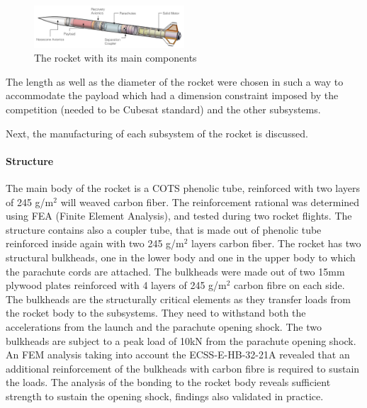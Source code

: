 \begin{figure}[h!]
\centering
\includegraphics[width=0.5\textwidth]{img/rocket_sw_annotated.jpg}
\caption{The rocket with its main components}
\label{f:rocket_adnoted}
\end{figure}

The length as well as the diameter of the rocket were chosen in such a way to accommodate the payload which had a dimension constraint imposed by the competition (needed to be Cubesat standard) and the other subsystems.

Next, the manufacturing of each subsystem of the rocket is discussed.



\paragraph{Structure}
\hfill \break
The main body of the rocket is a COTS phenolic tube, reinforced with two layers of 245 g/m$^2$ will weaved carbon fiber. The reinforcement rational was determined using FEA (Finite Element Analysis), and tested during two rocket flights.
The structure contains also a coupler tube, that is made out of phenolic tube reinforced inside again with two 245 g/m$^2$ layers carbon fiber.
The rocket has two structural bulkheads, one in the lower body and one in the upper body to which the parachute cords are attached. The bulkheads were made out of two 15mm plywood plates reinforced with 4 layers of 245 g/m$^2$ carbon fibre on each side.  The bulkheads are the structurally critical elements as they transfer loads from the rocket body to the subsystems. They need to withstand both the accelerations from the launch and the parachute opening shock. 
The two bulkheads are subject to a peak load of 10kN from the parachute opening shock. An FEM analysis taking into account the  ECSS-E-HB-32-21A revealed that an additional reinforcement of the bulkheads with carbon fibre is required to sustain the loads. The analysis of the bonding to the rocket body reveals sufficient strength to sustain the opening shock, findings also validated in practice.


